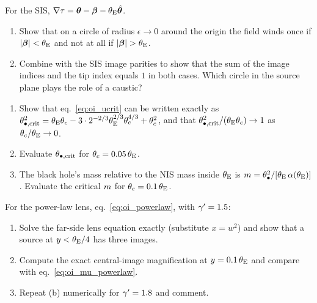 \begin{exercise}
\label{ex:oi_sis_tip}
For the SIS, $\nabla\tau=\boldsymbol{\theta}-\boldsymbol{\beta}-\theta_{\mathrm{E}}\hat{\boldsymbol{\theta}}$.
\begin{enumerate}[label=(\alph*)]
    \item Show that on a circle of radius $\epsilon\to0$ around the
          origin the field winds once if $|\boldsymbol{\beta}|<\theta_{\mathrm{E}}$ and not at
          all if $|\vecbeta|>\thetaE$.
    \item Combine with the SIS image parities to show that the sum of
          the image indices and the tip index equals $1$ in both cases.
          Which circle in the source plane plays the role of a caustic?
\end{enumerate}
\end{exercise}

\begin{exercise}
\label{ex:oi_critical_mass}
\begin{enumerate}[label=(\alph*)]
    \item Show that eq.~\eqref{eq:oi_ucrit} can be written exactly as
          $\theta_{\bullet,\rm crit}^2=\theta_{\mathrm{E}}\theta_c-3\cdot2^{-2/3}\theta_{\mathrm{E}}^{2/3}\theta_c^{4/3}+\theta_c^2$,
          and that $\theta_{\bullet,\rm crit}^2/(\theta_{\mathrm{E}}\theta_c)\to1$
          as $\theta_c/\theta_{\mathrm{E}}\to0$.
    \item Evaluate $\theta_{\bullet,\rm crit}$ for $\theta_c=0.05\,\theta_{\mathrm{E}}$.
    \item The black hole's mass relative to the NIS mass inside $\theta_{\mathrm{E}}$
          is $m=\theta_{\bullet}^2/[\theta_{\mathrm{E}}\,\alpha(\theta_{\mathrm{E}})]$.  Evaluate the
          critical $m$ for $\theta_c=0.1\,\theta_{\mathrm{E}}$.
\end{enumerate}
\end{exercise}

\begin{exercise}
\label{ex:oi_powerlaw}
For the power-law lens, eq.~\eqref{eq:oi_powerlaw}, with $\gamma'=1.5$:
\begin{enumerate}[label=(\alph*)]
    \item Solve the far-side lens equation exactly (substitute
          $x=w^2$) and show that a source at $y<\theta_{\mathrm{E}}/4$ has three
          images.
    \item Compute the exact central-image magnification at
          $y=0.1\,\theta_{\mathrm{E}}$ and compare with eq.~\eqref{eq:oi_mu_powerlaw}.
    \item Repeat (b) numerically for $\gamma'=1.8$ and comment.
\end{enumerate}
\end{exercise}

